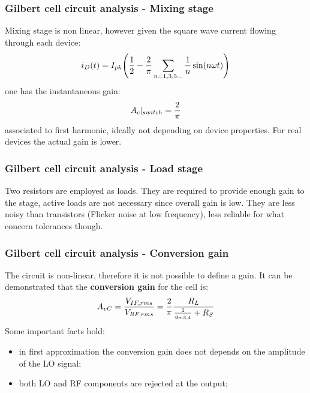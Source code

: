 \begin{frame}
	\frametitle{Gilbert cell circuit analysis - Mixing stage}
	Mixing stage is non linear, however given the square wave current flowing through each device:
	\begin{equation}
	i_D(t)=I_{pk}\Bigg(\frac{1}{2}-\frac{2}{\pi} \sum_{n=1,3,5 \dots}^{} \frac{1}{n}\sin(n\omega t)\Bigg) \notag
	\end{equation} 
	one has the instantaneous gain:
	\begin{equation}
	\label{eq_SwitchGain}
	A_c|_{switch} = \frac{2}{\pi} \notag
	\end{equation}
	associated to first harmonic, ideally not depending on device properties. For real devices the actual gain is lower.
\end{frame}

\begin{frame}
	\frametitle{Gilbert cell circuit analysis - Load stage}
	Two resistors are employed as loads. They are required to provide enough gain to the stage, active loads are not necessary since overall gain is low. They are less noisy than transistors (Flicker noise at low frequency), less reliable for what concern tolerances though.
\end{frame}

\begin{frame}
	\frametitle{Gilbert cell circuit analysis - Conversion gain}
	The circuit is non-linear, therefore it is not possible to define a gain. It can be demonstrated that the \textbf{conversion gain} for the cell is:
	\begin{equation}
	\label{eq:ConvGain}
	A_{vC} = \frac{V_{IF,rms}}{V_{RF,rms}} =  \frac{2}{\pi}\frac{R_L}{\frac{1}{g_{m3,4}}+R_S} \notag
	\end{equation}
	Some important facts hold:
	\begin{itemize}
		\item in first approximation the conversion gain does not depends on the amplitude of the LO signal;
		\item both LO and RF components are rejected at the output;
	\end{itemize}  
	
\end{frame}

